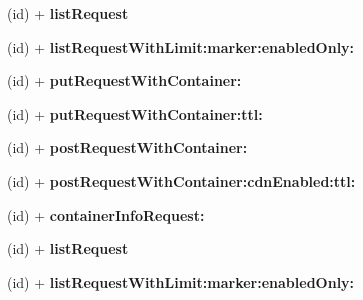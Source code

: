 \begin{DoxyCompactItemize}
\item 
\hypertarget{interface_a_s_i_cloud_files_c_d_n_request_a9d7f472b708be8a5bbff26ecf72ca0e7}{
(id) + {\bfseries list\-Request}}
\label{interface_a_s_i_cloud_files_c_d_n_request_a9d7f472b708be8a5bbff26ecf72ca0e7}

\item 
\hypertarget{interface_a_s_i_cloud_files_c_d_n_request_a3acbf036c7e416c2b6f66ac6be6a9617}{
(id) + {\bfseries list\-Request\-With\-Limit\-:marker\-:enabled\-Only\-:}}
\label{interface_a_s_i_cloud_files_c_d_n_request_a3acbf036c7e416c2b6f66ac6be6a9617}

\item 
\hypertarget{interface_a_s_i_cloud_files_c_d_n_request_a92d1b9ce687974a8ffab0b026a39eb28}{
(id) + {\bfseries put\-Request\-With\-Container\-:}}
\label{interface_a_s_i_cloud_files_c_d_n_request_a92d1b9ce687974a8ffab0b026a39eb28}

\item 
\hypertarget{interface_a_s_i_cloud_files_c_d_n_request_ab7db6c10a48bfb16bdae65e5d7740148}{
(id) + {\bfseries put\-Request\-With\-Container\-:ttl\-:}}
\label{interface_a_s_i_cloud_files_c_d_n_request_ab7db6c10a48bfb16bdae65e5d7740148}

\item 
\hypertarget{interface_a_s_i_cloud_files_c_d_n_request_aa201c29194b1b8465c6b45a582904573}{
(id) + {\bfseries post\-Request\-With\-Container\-:}}
\label{interface_a_s_i_cloud_files_c_d_n_request_aa201c29194b1b8465c6b45a582904573}

\item 
\hypertarget{interface_a_s_i_cloud_files_c_d_n_request_adc0b232663fe13af064f00522d6da305}{
(id) + {\bfseries post\-Request\-With\-Container\-:cdn\-Enabled\-:ttl\-:}}
\label{interface_a_s_i_cloud_files_c_d_n_request_adc0b232663fe13af064f00522d6da305}

\item 
\hypertarget{interface_a_s_i_cloud_files_c_d_n_request_a7530647efafef518b550f6390b6b4c30}{
(id) + {\bfseries container\-Info\-Request\-:}}
\label{interface_a_s_i_cloud_files_c_d_n_request_a7530647efafef518b550f6390b6b4c30}

\item 
\hypertarget{interface_a_s_i_cloud_files_c_d_n_request_a9d7f472b708be8a5bbff26ecf72ca0e7}{
(id) + {\bfseries list\-Request}}
\label{interface_a_s_i_cloud_files_c_d_n_request_a9d7f472b708be8a5bbff26ecf72ca0e7}

\item 
\hypertarget{interface_a_s_i_cloud_files_c_d_n_request_a3acbf036c7e416c2b6f66ac6be6a9617}{
(id) + {\bfseries list\-Request\-With\-Limit\-:marker\-:enabled\-Only\-:}}
\label{interface_a_s_i_cloud_files_c_d_n_request_a3acbf036c7e416c2b6f66ac6be6a9617}


\end{DoxyCompactItemize}
